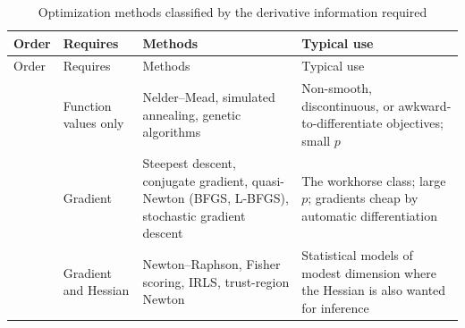 \documentclass[
  letterpaper,
  DIV=11,
  numbers=noendperiod]{scrreprt}
\begin{document}
\begin{longtable}[]{@{}
  >{\raggedleft\arraybackslash}p{}
  >{\raggedright\arraybackslash}p{}
  >{\raggedright\arraybackslash}p{}
  >{\raggedright\arraybackslash}p{}@{}}
\caption{Optimization methods classified by the derivative information
required}\label{tbl-orders}\tabularnewline
\toprule\noalign{}
\begin{minipage}[b]{\linewidth}\raggedleft
Order
\end{minipage} & \begin{minipage}[b]{\linewidth}\raggedright
Requires
\end{minipage} & \begin{minipage}[b]{\linewidth}\raggedright
Methods
\end{minipage} & \begin{minipage}[b]{\linewidth}\raggedright
Typical use
\end{minipage} \\
\midrule\noalign{}
\endfirsthead
\toprule\noalign{}
\begin{minipage}[b]{\linewidth}\raggedleft
Order
\end{minipage} & \begin{minipage}[b]{\linewidth}\raggedright
Requires
\end{minipage} & \begin{minipage}[b]{\linewidth}\raggedright
Methods
\end{minipage} & \begin{minipage}[b]{\linewidth}\raggedright
Typical use
\end{minipage} \\
\midrule\noalign{}
\endhead
\bottomrule\noalign{}
\endlastfoot
0 & Function values only & Nelder--Mead, simulated annealing, genetic
algorithms & Non-smooth, discontinuous, or awkward-to-differentiate
objectives; small \(p\) \\
1 & Gradient & Steepest descent, conjugate gradient, quasi-Newton (BFGS,
L-BFGS), stochastic gradient descent & The workhorse class; large \(p\);
gradients cheap by automatic differentiation \\
2 & Gradient and Hessian & Newton--Raphson, Fisher scoring, IRLS,
trust-region Newton & Statistical models of modest dimension where the
Hessian is also wanted for inference \\
\end{longtable}
\end{document}
